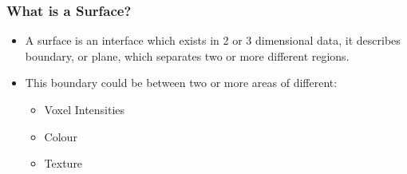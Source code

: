 \documentclass[9pt]{beamer}
\begin{document}
	\begin{frame}
			\frametitle{What is a Surface?}
				
				\begin{itemize}
						\item A surface is an interface which exists in 2 or 3 dimensional data, it describes boundary, or plane, which separates two or more different regions.\\
						\item This boundary could be between two or more areas of different:
				
						\begin{itemize}
								\item Voxel Intensities
								\item Colour
								\item Texture

						\end{itemize}
				
				\end{itemize}

	\end{frame}
\end{document}
